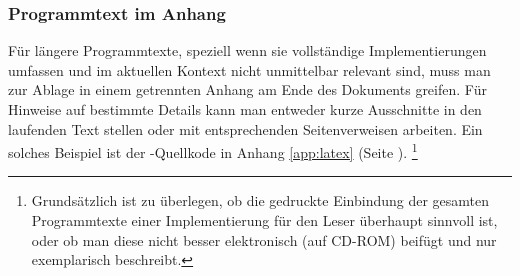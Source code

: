 \subsubsection{Programmtext im Anhang}

Für längere Programmtexte, speziell wenn sie vollständige
Implementierungen umfassen und im aktuellen Kontext nicht
unmittelbar relevant sind, muss man zur Ablage in einem getrennten
Anhang am Ende des Dokuments greifen. Für Hinweise auf bestimmte
Details kann man entweder kurze Ausschnitte in den laufenden Text
stellen oder mit entsprechenden Seitenverweisen arbeiten. Ein
solches Beispiel ist der \latex-Quellkode in Anhang
\ref{app:latex} (Seite \pageref{app:latex}).%
\footnote{%
Grundsätzlich ist zu überlegen, ob die gedruckte Einbindung der gesamten
Programmtexte einer Implementierung für den Leser überhaupt sinnvoll ist, oder
ob man diese nicht besser elektronisch (auf CD-ROM) beifügt und nur exemplarisch
beschreibt.}

